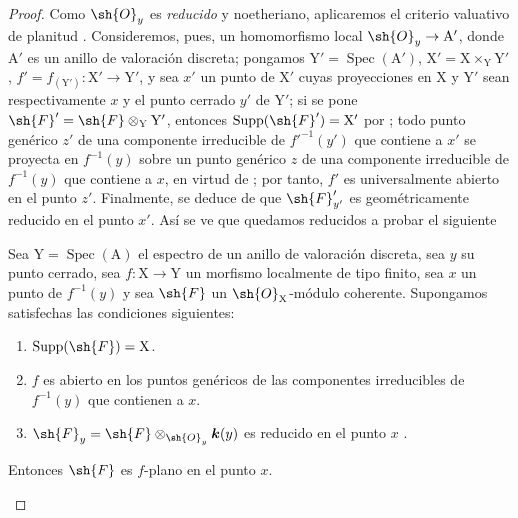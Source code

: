 \begin{proof}
\label{IV.15.2.2-proof}
Como $\sh{O}_y$ es \emph{reducido} y noetheriano, aplicaremos el criterio valuativo de planitud .
Consideremos, pues, un homomorfismo local $\sh{O}_y\to\mathrm{A}'$, donde $\mathrm{A}'$ es un anillo de valoración discreta; pongamos $\mathrm{Y}'=\operatorname{Spec}(\mathrm{A}')$, $\mathrm{X}'=\mathrm{X}\times_\mathrm{Y}\mathrm{Y}'$, $f'=f_{(\mathrm{Y}')}:\mathrm{X}'\to\mathrm{Y}'$, y sea $x'$ un punto de $\mathrm{X}'$ cuyas proyecciones en $\mathrm{X}$ y $\mathrm{Y}'$ sean respectivamente $x$ y el punto cerrado $y'$ de $\mathrm{Y}'$; si se pone $\sh{F}'=\sh{F}\otimes_\mathrm{Y}\mathrm{Y}'$, entonces $\operatorname{Supp}(\sh{F}')=\mathrm{X}'$ por ; todo punto genérico $z'$ de una componente irreducible de $f'^{-1}(y')$ que contiene a $x'$ se proyecta en $f^{-1}(y)$ sobre un punto genérico $z$ de una componente irreducible de $f^{-1}(y)$ que contiene a $x$, en virtud de ; por tanto, $f'$ es universalmente abierto en el punto $z'$.
Finalmente, se deduce de  que $\sh{F}_{y'}'$ es geométricamente reducido en el punto $x'$.
Así se ve que quedamos reducidos a probar el siguiente

\begin{lemma}[15.2.2.1]
\label{IV.15.2.2.1}
Sea $\mathrm{Y}=\operatorname{Spec}(\mathrm{A})$ el espectro de un anillo de valoración discreta, sea $y$ su punto cerrado, sea $f:\mathrm{X}\to\mathrm{Y}$ un morfismo localmente de tipo finito, sea $x$ un punto de $f^{-1}(y)$ y sea $\sh{F}$ un $\sh{O}_\mathrm{X}$-módulo coherente.
Supongamos satisfechas las condiciones siguientes:
\begin{enumerate}[label=\textup{(\roman*)}]
  \item $\operatorname{Supp}(\sh{F})=\mathrm{X}$.
  \item $f$ es abierto en los puntos genéricos de las componentes irreducibles de $f^{-1}(y)$ que contienen a $x$.
  \item $\sh{F}_y=\sh{F}\otimes_{\sh{O}_y}\boldsymbol{k}(y)$ es reducido en el punto $x$ .
\end{enumerate}
Entonces $\sh{F}$ es $f$-plano en el punto $x$.
\end{lemma}


\end{proof}
